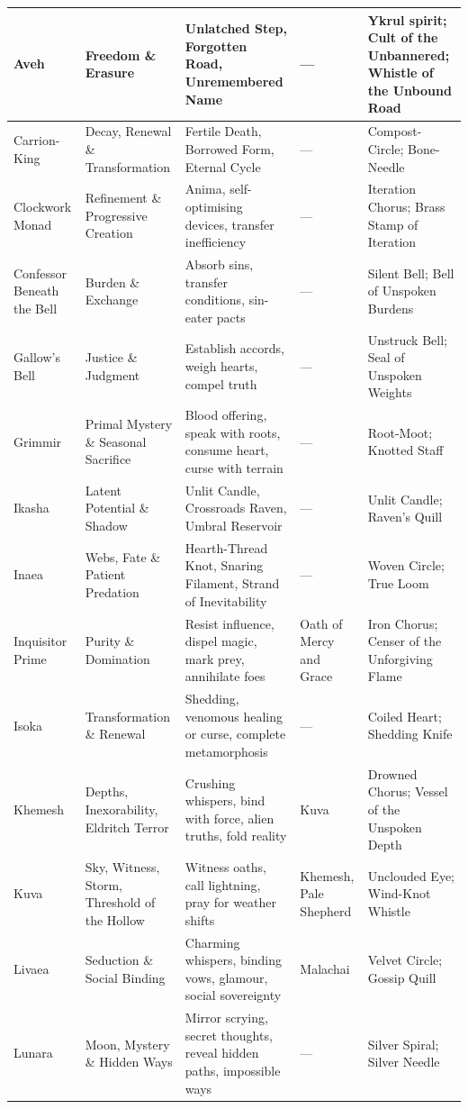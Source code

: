 \begin{center}
\begin{longtable}{p{2.2cm}p{2.5cm}p{3.5cm}p{1.6cm}p{3.2cm}}
Aveh & Freedom \& Erasure & Unlatched Step, Forgotten Road, Unremembered Name & --- & Ykrul spirit; Cult of the Unbannered; Whistle of the Unbound Road \\
\hline
Carrion-King & Decay, Renewal \& Transformation & Fertile Death, Borrowed Form, Eternal Cycle & --- & Compost-Circle; Bone-Needle \\
\hline
Clockwork Monad & Refinement \& Progressive Creation & Anima, self-optimising devices, transfer inefficiency & --- & Iteration Chorus; Brass Stamp of Iteration \\
\hline
Confessor Beneath the Bell & Burden \& Exchange & Absorb sins, transfer conditions, sin-eater pacts & --- & Silent Bell; Bell of Unspoken Burdens \\
\hline
Gallow's Bell & Justice \& Judgment & Establish accords, weigh hearts, compel truth & --- & Unstruck Bell; Seal of Unspoken Weights \\
\hline
Grimmir & Primal Mystery \& Seasonal Sacrifice & Blood offering, speak with roots, consume heart, curse with terrain & --- & Root-Moot; Knotted Staff \\
\hline
Ikasha & Latent Potential \& Shadow & Unlit Candle, Crossroads Raven, Umbral Reservoir & --- & Unlit Candle; Raven's Quill \\
\hline
Inaea & Webs, Fate \& Patient Predation & Hearth-Thread Knot, Snaring Filament, Strand of Inevitability & --- & Woven Circle; True Loom \\
\hline
Inquisitor Prime & Purity \& Domination & Resist influence, dispel magic, mark prey, annihilate foes & Oath of Mercy and Grace & Iron Chorus; Censer of the Unforgiving Flame \\
\hline
Isoka & Transformation \& Renewal & Shedding, venomous healing or curse, complete metamorphosis & --- & Coiled Heart; Shedding Knife \\
\hline
Khemesh & Depths, Inexorability, Eldritch Terror & Crushing whispers, bind with force, alien truths, fold reality & Kuva & Drowned Chorus; Vessel of the Unspoken Depth \\
\hline
Kuva & Sky, Witness, Storm, Threshold of the Hollow & Witness oaths, call lightning, pray for weather shifts & Khemesh, Pale Shepherd & Unclouded Eye; Wind-Knot Whistle \\
\hline
Livaea & Seduction \& Social Binding & Charming whispers, binding vows, glamour, social sovereignty & Malachai & Velvet Circle; Gossip Quill \\
\hline
Lunara & Moon, Mystery \& Hidden Ways & Mirror scrying, secret thoughts, reveal hidden paths, impossible ways & --- & Silver Spiral; Silver Needle \\

\end{longtable}
\end{center}
